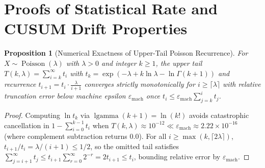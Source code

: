 \documentclass[10pt,twocolumn,letterpaper]{article}
\makeatletter
\theoremstyle{plain}
\newtheorem{proposition}[theorem]{Proposition}
\theoremstyle{definition}
\theoremstyle{remark}
\DeclareRobustCommand{\_}{\ifmmode\nfss@text{\textunderscore}\else\textunderscore\penalty\@highpenalty\hskip\z@skip\fi}
\makeatother
\begin{document}
\section{Proofs of Statistical Rate and CUSUM Drift Properties}
\label{app:stats}

\begin{proposition}[Numerical Exactness of Upper-Tail Poisson Recurrence]
For $X \sim \operatorname{Poisson}(\lambda)$ with $\lambda > 0$ and integer $k \ge 1$, the upper tail $T(k, \lambda) = \sum_{i=k}^{\infty} t_i$ with $t_k = \exp(-\lambda + k \ln \lambda - \ln \Gamma(k + 1))$ and recurrence $t_{i+1} = t_i \cdot \frac{\lambda}{i + 1}$ converges strictly monotonically for $i \ge \lceil \lambda \rceil$ with relative truncation error below machine epsilon $\varepsilon_{\text{mach}}$ once $t_i \le \varepsilon_{\text{mach}} \sum_{j=k}^{i} t_j$.
\end{proposition}
\begin{proof}
Computing $\ln t_k$ via $\operatorname{lgamma}(k + 1) = \ln(k!)$ avoids catastrophic cancellation in $1 - \sum_{i=0}^{k-1} t_i$ when $T(k, \lambda) \approx 10^{-12} \ll \varepsilon_{\text{mach}} \approx 2.22 \times 10^{-16}$ (where complement subtraction returns $0.0$). For all $i \ge \max(k, \lceil 2\lambda \rceil)$, $t_{i+1}/t_i = \lambda/(i+1) \le 1/2$, so the omitted tail satisfies $\sum_{j=i+1}^{\infty} t_j \le t_{i+1} \sum_{r=0}^{\infty} 2^{-r} = 2 t_{i+1} \le t_i$, bounding relative error by $\varepsilon_{\text{mach}}$.
\end{proof}
\end{document}
